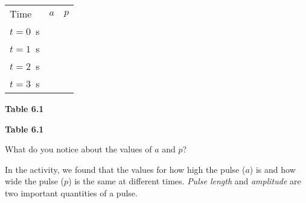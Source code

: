           \begin{table}[H]
        \begin{center}
      \label{m38801*id313027}
    \noindent
      \tablelasttail{}
      \begin{xtabular}[t]{|l|l|l|}\hline
        Time &
                  $a$
                 &
                  $p$
     \tabularnewline{}
        $t=0$~s &
         &
     \tabularnewline{}
        $t=1$~s &
         &
     \tabularnewline{}
        $t=2$~s &
         &
     \tabularnewline{}
        $t=3$~s &
         &
     \tabularnewline{}
    \end{xtabular}
      \end{center}
    \begin{center}{\small\bfseries Table 6.1}\end{center}
    \begin{caption}{\small\bfseries Table 6.1}\end{caption}
\end{table}
    \par
        \label{m38801*id313222}What do you notice about the values of $a$ and $p$?
 \par 
        \label{m38801*id313246}In the activity, we found that the values for how high the pulse ($a$) is and how wide the pulse ($p$) is the same at different times. \textsl{Pulse length} and \textsl{amplitude} are two important quantities of a pulse.\par 
      \label{m38801*uid3}
